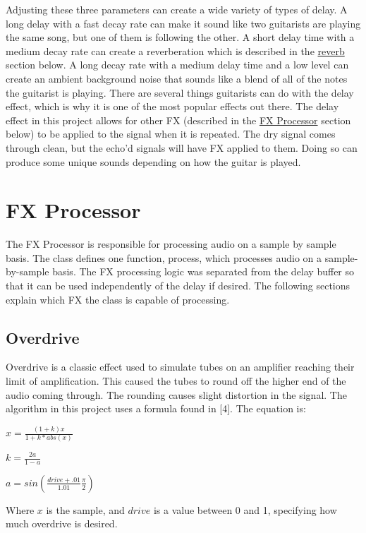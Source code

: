 Adjusting these three parameters can create a wide variety of types of delay. A long delay with a fast decay rate can make it sound like two guitarists are playing the same song, but one of them is following the other. A short delay time with a medium decay rate can create a reverberation which is described in the \hyperlink{index_reverb}{reverb} section below. A long decay rate with a medium delay time and a low level can create an ambient background noise that sounds like a blend of all of the notes the guitarist is playing. There are several things guitarists can do with the delay effect, which is why it is one of the most popular effects out there. The delay effect in this project allows for other F\+X (described in the \hyperlink{index_fx}{F\+X Processor} section below) to be applied to the signal when it is repeated. The dry signal comes through clean, but the echo'd signals will have F\+X applied to them. Doing so can produce some unique sounds depending on how the guitar is played.\hypertarget{index_fx}{}\section{F\+X Processor}\label{index_fx}
The F\+X Processor is responsible for processing audio on a sample by sample basis. The class defines one function, {\ttfamily process}, which processes audio on a sample-\/by-\/sample basis. The F\+X processing logic was separated from the delay buffer so that it can be used independently of the delay if desired. The following sections explain which F\+X the class is capable of processing.\hypertarget{index_overdrive}{}\subsection{Overdrive}\label{index_overdrive}
Overdrive is a classic effect used to simulate tubes on an amplifier reaching their limit of amplification. This caused the tubes to round off the higher end of the audio coming through. The rounding causes slight distortion in the signal. The algorithm in this project uses a formula found in \mbox{[}4\mbox{]}. The equation is\+:

$x=\frac{(1+k)x}{1+k*abs(x)}$ \par
 $k=\frac{2a}{1-a}$ \par
 $a=sin(\frac{drive+.01}{1.01}\frac{\pi}{2})$

Where $x$ is the sample, and $drive$ is a value between 0 and 1, specifying how much overdrive is desired.

